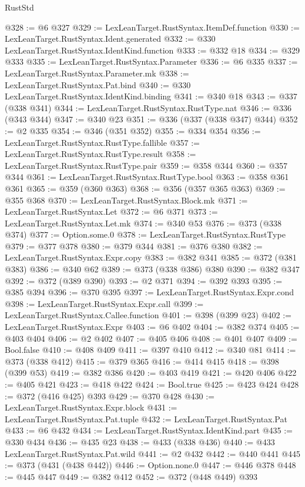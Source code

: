 \begin{lexlean}{RustStd}
\begin{coremodule}
@328 := @6 @327
@329 := LexLeanTarget.RustSyntax.ItemDef.function
@330 := LexLeanTarget.RustSyntax.Ident.generated
@332 := @330 LexLeanTarget.RustSyntax.IdentKind.function
@333 := @332 @18
@334 := @329 @333
@335 := LexLeanTarget.RustSyntax.Parameter
@336 := @6 @335
@337 := LexLeanTarget.RustSyntax.Parameter.mk
@338 := LexLeanTarget.RustSyntax.Pat.bind
@340 := @330 LexLeanTarget.RustSyntax.IdentKind.binding
@341 := @340 @18
@343 := @337 (@338 @341)
@344 := LexLeanTarget.RustSyntax.RustType.nat
@346 := @336 (@343 @344)
@347 := @340 @23
@351 := @336 (@337 (@338 @347) @344)
@352 := @2 @335
@354 := @346 (@351 @352)
@355 := @334 @354
@356 := LexLeanTarget.RustSyntax.RustType.fallible
@357 := LexLeanTarget.RustSyntax.RustType.result
@358 := LexLeanTarget.RustSyntax.RustType.pair
@359 := @358 @344
@360 := @357 @344
@361 := LexLeanTarget.RustSyntax.RustType.bool
@363 := @358 @361 @361
@365 := @359 (@360 @363)
@368 := @356 (@357 @365 @363)
@369 := @355 @368
@370 := LexLeanTarget.RustSyntax.Block.mk
@371 := LexLeanTarget.RustSyntax.Let
@372 := @6 @371
@373 := LexLeanTarget.RustSyntax.Let.mk
@374 := @340 @53
@376 := @373 (@338 @374)
@377 := Option.some.{0}
@378 := LexLeanTarget.RustSyntax.RustType
@379 := @377 @378
@380 := @379 @344
@381 := @376 @380
@382 := LexLeanTarget.RustSyntax.Expr.copy
@383 := @382 @341
@385 := @372 (@381 @383)
@386 := @340 @62
@389 := @373 (@338 @386) @380
@390 := @382 @347
@392 := @372 (@389 @390)
@393 := @2 @371
@394 := @392 @393
@395 := @385 @394
@396 := @370 @395
@397 := LexLeanTarget.RustSyntax.Expr.cond
@398 := LexLeanTarget.RustSyntax.Expr.call
@399 := LexLeanTarget.RustSyntax.Callee.function
@401 := @398 (@399 @23)
@402 := LexLeanTarget.RustSyntax.Expr
@403 := @6 @402
@404 := @382 @374
@405 := @403 @404
@406 := @2 @402
@407 := @405 @406
@408 := @401 @407
@409 := Bool.false
@410 := @408 @409
@411 := @397 @410
@412 := @340 @81
@414 := @373 (@338 @412)
@415 := @379 @365
@416 := @414 @415
@418 := @398 (@399 @53)
@419 := @382 @386
@420 := @403 @419
@421 := @420 @406
@422 := @405 @421
@423 := @418 @422
@424 := Bool.true
@425 := @423 @424
@428 := @372 (@416 @425) @393
@429 := @370 @428
@430 := LexLeanTarget.RustSyntax.Expr.block
@431 := LexLeanTarget.RustSyntax.Pat.tuple
@432 := LexLeanTarget.RustSyntax.Pat
@433 := @6 @432
@434 := LexLeanTarget.RustSyntax.IdentKind.part
@435 := @330 @434
@436 := @435 @23
@438 := @433 (@338 @436)
@440 := @433 LexLeanTarget.RustSyntax.Pat.wild
@441 := @2 @432
@442 := @440 @441
@445 := @373 (@431 (@438 @442))
@446 := Option.none.{0}
@447 := @446 @378
@448 := @445 @447
@449 := @382 @412
@452 := @372 (@448 @449) @393

\end{coremodule}
\end{lexlean}
